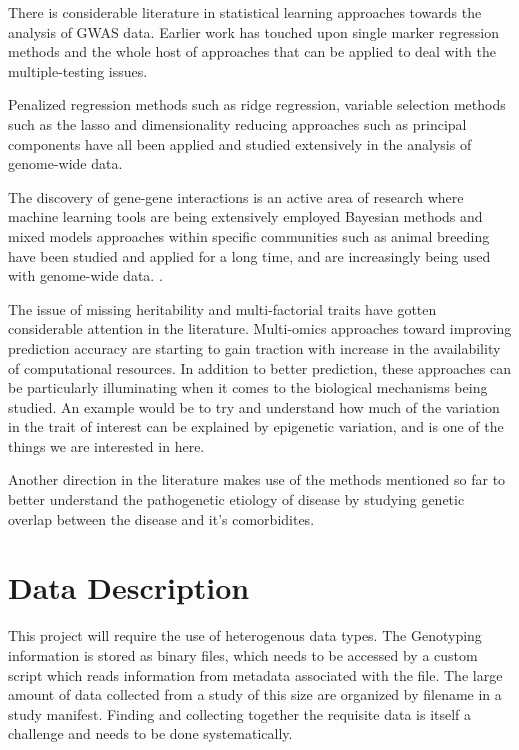 \documentclass{sig-alternate-05-2015}
\begin{document}
There is considerable literature in statistical learning approaches towards the analysis of GWAS data. Earlier work has
touched upon single marker regression methods and the whole host of approaches that can be applied to
deal with the multiple-testing issues.

Penalized regression methods such as ridge regression,\cite{austin_penalized_2013}
variable selection methods such as the lasso  and dimensionality reducing approaches such as principal components \cite{price_principal_2006} have all been applied and studied extensively in the analysis of
genome-wide data.

The discovery of gene-gene interactions is an active area of research where machine learning tools are being extensively employed \cite{upstill-goddard_machine_2013}
Bayesian methods and mixed models approaches within specific communities such as animal breeding have been
studied and applied for a long time, and are increasingly being used with genome-wide data. \cite{de_los_campos_whole-genome_2013}.

The issue of missing heritability and multi-factorial traits have gotten considerable attention in the literature. Multi-omics approaches toward improving prediction accuracy
are starting to gain traction with increase in the availability of computational resources. In addition to better prediction, these approaches can be particularly illuminating when
it comes to the biological mechanisms being studied. \cite{kim_multi-omics_2016}
An example would be to try and understand how much of the variation in the trait of interest can be explained by epigenetic variation, and is one of the things we are interested in here.

Another direction in the literature makes use of the methods mentioned so far to better understand the pathogenetic etiology of disease by studying genetic overlap between the disease and it's comorbidites.


\section{Data Description}

This project will require the use of heterogenous data types. The Genotyping information is stored as binary files, which needs to be accessed by a custom script
which reads information from metadata associated with the file. The large amount of data collected from a study of this size are organized by filename in a study manifest. Finding and collecting together the requisite data is itself
a challenge and needs to be done systematically.
\end{document}
